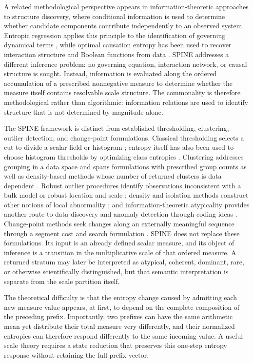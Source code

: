 \documentclass[aip,cha,reprint,superscriptaddress,floatfix]{revtex4-2}
\theoremstyle{definition}
\theoremstyle{remark}
\begin{document}
A related methodological perspective appears in information-theoretic approaches to structure discovery, where conditional information is used to determine whether candidate components contribute independently to an observed system. Entropic regression applies this principle to the identification of governing dynamical terms \cite{almomani2020}, while optimal causation entropy has been used to recover interaction structure and Boolean functions from data \cite{sun2022}. SPINE addresses a different inference problem: no governing equation, interaction network, or causal structure is sought. Instead, information is evaluated along the ordered accumulation of a prescribed nonnegative measure to determine whether the measure itself contains resolvable scale structure. The commonality is therefore methodological rather than algorithmic: information relations are used to identify structure that is not determined by magnitude alone.

The SPINE framework is distinct from established thresholding, clustering, outlier detection, and change-point formulations. Classical thresholding selects a cut to divide a scalar field or histogram \cite{otsu1979}; entropy itself has also been used to choose histogram thresholds by optimizing class entropies \cite{kapur1985}. Clustering addresses grouping in a data space and spans formulations with prescribed group counts as well as density-based methods whose number of returned clusters is data dependent \cite{jain2010,ester1996}. Robust outlier procedures identify observations inconsistent with a bulk model or robust location and scale \cite{tukey1977,hampel1974}; density and isolation methods construct other notions of local abnormality \cite{breunig2000,liu2008,chandola2009}; and information-theoretic atypicality provides another route to data discovery and anomaly detection through coding ideas \cite{hostmadsen2019}. Change-point methods seek changes along an externally meaningful sequence through a segment cost and search formulation \cite{killick2012,truong2020}. SPINE does not replace these formulations. Its input is an already defined scalar measure, and its object of inference is a transition in the multiplicative scale of that ordered measure. A returned stratum may later be interpreted as atypical, coherent, dominant, rare, or otherwise scientifically distinguished, but that semantic interpretation is separate from the scale partition itself.

The theoretical difficulty is that the entropy change caused by admitting each new measure value appears, at first, to depend on the complete composition of the preceding prefix. Importantly, two prefixes can have the same arithmetic mean yet distribute their total measure very differently, and their normalized entropies can therefore respond differently to the same incoming value. A useful scale theory requires a state reduction that preserves this one-step entropy response without retaining the full prefix vector. 
\end{document}

